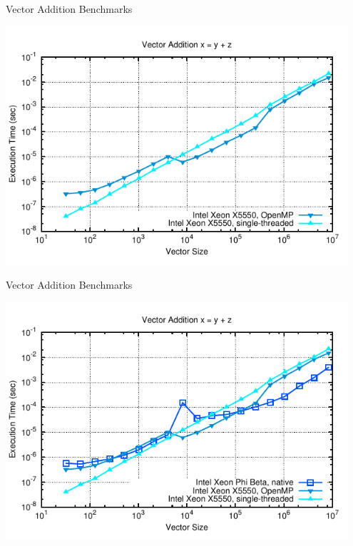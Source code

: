 \begin{frame}{Vector Addition Benchmarks}
  \begin{center}
   \includegraphics[width=0.95\textwidth]{figures/vector-timings-2}
  \end{center}
\end{frame}

\begin{frame}{Vector Addition Benchmarks}
  \begin{center}
   \includegraphics[width=0.95\textwidth]{figures/vector-timings-3}
  \end{center}
\end{frame}

